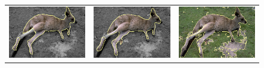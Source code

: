 \documentclass[smallextended]{svjour3}       %
\begin{document}
{{\begin{figure}[hp!]
\begin{tabular}{ccc}
		\includegraphics[scale=0.2]{images/segmentation/bc/canguru/gc-seg.png} &
		\includegraphics[scale=0.2]{images/segmentation/bc/canguru/corrected-seg.png} &					\includegraphics[scale=0.2]{images/segmentation/schoenemann/canguru/canguru-seg.png}\\		

\end{tabular}
\end{figure}}}
\end{document}
